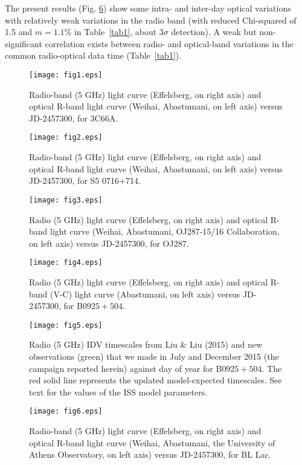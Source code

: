 \documentclass[a4paper,fleqn,usenatbib]{mnras}
\begin{document}
The present results (Fig. \ref{fig6}) show some intra- and inter-day optical variations with relatively weak variations in the radio band (with reduced Chi-squared of 1.5 and \(m=1.1\)\% in Table~\ref{tab1}, about \(3\sigma\) detection). A weak but non-significant correlation exists between radio- and optical-band variations in the common radio-optical data time (Table~\ref{tab1}).


\begin{figure}
  \texttt{[image: fig1.eps]}
  \caption{Radio-band (5 GHz) light curve (Effelsberg, on right axis) and optical R-band light curve (Weihai, Abastumani, on left axis) versus JD-2457300, for 3C66A.}
  \label{fig1}
\end{figure}

\begin{figure}
  \texttt{[image: fig2.eps]}
  \caption{Radio-band (5 GHz) light curve (Effelsberg, on right axis) and optical R-band light curve (Weihai, Abastumani, on left axis) versus JD-2457300, for S5 0716+714.}
  \label{fig2}
\end{figure}

\begin{figure}
  \texttt{[image: fig3.eps]}
  \caption{Radio (5 GHz) light curve (Effelsberg, on right axis) and optical R-band light curve (Weihai, Abastumani, OJ287-15/16 Collaboration, on left axis) versus JD-2457300, for OJ287.}
  \label{fig3}
\end{figure}

\begin{figure}
  \texttt{[image: fig4.eps]}
  \caption{Radio (5 GHz) light curve (Effelsberg, on right axis) and optical R-band (V-C) light curve (Abastumani, on left axis) versus JD-2457300, for B\(0925+504\).}
  \label{fig4}
\end{figure}

\begin{figure}
  \texttt{[image: fig5.eps]}
  \caption{Radio (5 GHz) IDV timescales from Liu \& Liu (2015) and new observations (green) that we made in July and December 2015 (the campaign reported herein) against day of year for B\(0925+504\). The red solid line represents the updated model-expected timescales. See text for the values of the ISS model parameters.}
  \label{fig5}
\end{figure}

\begin{figure}
  \texttt{[image: fig6.eps]}
  \caption{Radio-band (5 GHz) light curve (Effelsberg, on right axis) and optical R-band light curve (Weihai, Abastumani, the University of Athens
Observatory, on left axis) versus JD-2457300, for BL Lac.}
  \label{fig6}
\end{figure}
\end{document}
